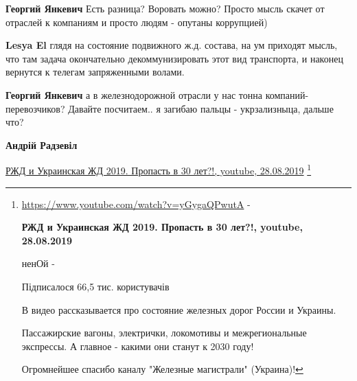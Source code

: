 \begin{itemize}
\begin{itemize}
 
\textbf{Георгий Янкевич} Есть разница? Воровать можно? Просто мысль скачет от отраслей к компаниям и просто людям - опутаны коррупцией)

 
\textbf{Lesya El} глядя на состояние подвижного ж.д. состава, на ум приходят мысль, что там задача окончательно декоммунизировать этот вид транспорта, и наконец вернутся к телегам запряженными волами.


 
\textbf{Георгий Янкевич} а в железнодорожной отрасли у нас тонна компаний-перевозчиков? Давайте посчитаем.. я загибаю пальцы - укрзализныца, дальше что?

 
\textbf{Андрій Радзевіл}

\href{https://www.youtube.com/watch?v=yGygaQPwutA}{РЖД и Украинская ЖД 2019. Пропасть в 30 лет?!, youtube, 28.08.2019}
\footnote{

\url{https://www.youtube.com/watch?v=yGygaQPwutA} - \par
{\bfseries РЖД и Украинская ЖД 2019. Пропасть в 30 лет?!, youtube, 28.08.2019}

ненОй - 

Підписалося 66,5 тис. користувачів

В видео рассказывается про состояние железных дорог России и Украины.

Пассажирские вагоны, электрички, локомотивы и межрегиональные экспрессы. А
главное - какими они станут к 2030 году! 

Огромнейшее спасибо каналу "Железные магистрали" (Украина)!

}
\end{itemize}
\end{itemize}
